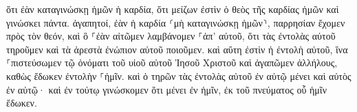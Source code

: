 \documentclass{openreader}
\begin{document}
ὅτι ἐὰν καταγινώσκῃ ἡμῶν ἡ καρδία, ὅτι μείζων ἐστὶν ὁ θεὸς τῆς καρδίας ἡμῶν καὶ γινώσκει πάντα. 
ἀγαπητοί, ἐὰν ἡ καρδία ⸂μὴ καταγινώσκῃ ἡμῶν⸃, παρρησίαν ἔχομεν πρὸς τὸν θεόν, 
καὶ ὃ ⸀ἐὰν αἰτῶμεν λαμβάνομεν ⸀ἀπ’ αὐτοῦ, ὅτι τὰς ἐντολὰς αὐτοῦ τηροῦμεν καὶ τὰ ἀρεστὰ ἐνώπιον αὐτοῦ ποιοῦμεν. 
καὶ αὕτη ἐστὶν ἡ ἐντολὴ αὐτοῦ, ἵνα ⸀πιστεύσωμεν τῷ ὀνόματι τοῦ υἱοῦ αὐτοῦ Ἰησοῦ Χριστοῦ καὶ ἀγαπῶμεν ἀλλήλους, καθὼς ἔδωκεν ἐντολὴν ⸀ἡμῖν. 
καὶ ὁ τηρῶν τὰς ἐντολὰς αὐτοῦ ἐν αὐτῷ μένει καὶ αὐτὸς ἐν αὐτῷ· καὶ ἐν τούτῳ γινώσκομεν ὅτι μένει ἐν ἡμῖν, ἐκ τοῦ πνεύματος οὗ ἡμῖν ἔδωκεν. 
\end{document}

